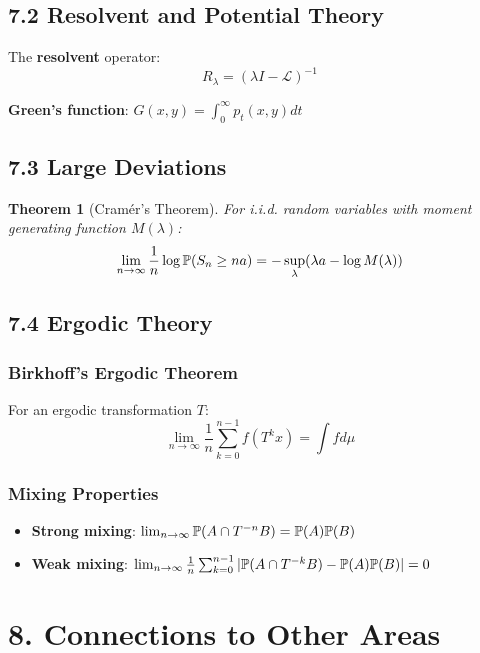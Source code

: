 \documentclass{amsart}
\let\originalmathbb\mathbb
\renewcommand{\mathbb}[1]{%
    \ifstrequal{#1}{1}{\mathbbm{#1}}{\originalmathbb{#1}}%
}
\theoremstyle{plain}
\newtheorem{theorem}{Theorem}[section]
\theoremstyle{definition}
\theoremstyle{remark}
\begin{document}
\subsection{7.2 Resolvent and Potential Theory}

The \textbf{resolvent} operator:
\[
R_\lambda = (\lambda I - \mathcal{L})^{-1}
\]

\textbf{Green's function}: $G(x,y) = \int_0^\infty p_t(x,y)dt$

\subsection{7.3 Large Deviations}

\begin{theorem}[Cramér's Theorem]
For i.i.d. random variables with moment generating function $M(\lambda)$:
\[
\lim_{n \to \infty} \frac{1}{n}\log \mathbb{P}(S_n \geq na) = -\sup_\lambda(\lambda a - \log M(\lambda))
\]
\end{theorem}
\subsection{7.4 Ergodic Theory}

\subsubsection{Birkhoff's Ergodic Theorem}

For an ergodic transformation $T$:
\[
\lim_{n \to \infty} \frac{1}{n}\sum_{k=0}^{n-1} f(T^k x) = \int f d\mu
\]

\subsubsection{Mixing Properties}

\begin{itemize}
	\item \textbf{Strong mixing}: $\lim_{n \to \infty} \mathbb{P}(A \cap T^{-n}B) = \mathbb{P}(A)\mathbb{P}(B)$
	\item \textbf{Weak mixing}: $\lim_{n \to \infty} \frac{1}{n}\sum_{k=0}^{n-1} |\mathbb{P}(A \cap T^{-k}B) - \mathbb{P}(A)\mathbb{P}(B)| = 0$
\end{itemize}

\section{8. Connections to Other Areas}
\end{document}
